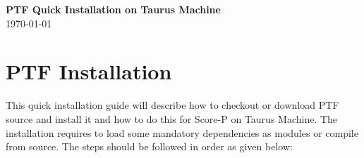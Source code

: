 \documentclass[12pt]{article}
\begin{document}
\begin{titlepage}\centering
\vspace*{\fill}
\Huge \textbf{PTF Quick Installation on Taurus Machine}\\
{\large \today}\\[3cm] %
\vspace*{\fill}
\end{titlepage}
\clearpage
\newpage 

\section{PTF Installation} 

This quick installation guide will describe how to checkout or download PTF source and install it and how to do this for Score-P on Taurus Machine. The installation requires to load some mandatory dependencies as modules or compile from source. The steps should be followed in order as given below:
\end{document}
